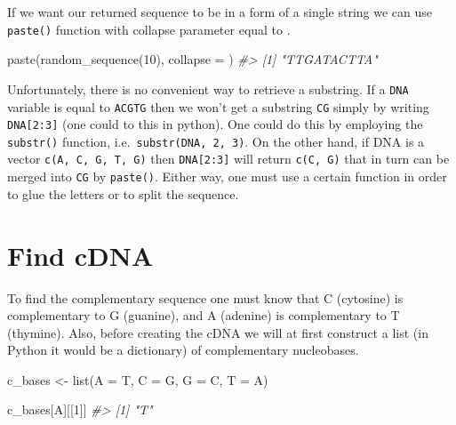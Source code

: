 \documentclass[
]{book}
\newenvironment{Shaded}{\begin{snugshade}}{\end{snugshade}}
\newcommand{\AttributeTok}[1]{\textcolor[rgb]{0.77,0.63,0.00}{#1}}
\newcommand{\CommentTok}[1]{\textcolor[rgb]{0.56,0.35,0.01}{\textit{#1}}}
\newcommand{\DecValTok}[1]{\textcolor[rgb]{0.00,0.00,0.81}{#1}}
\newcommand{\FunctionTok}[1]{\textcolor[rgb]{0.00,0.00,0.00}{#1}}
\newcommand{\NormalTok}[1]{#1}
\newcommand{\OtherTok}[1]{\textcolor[rgb]{0.56,0.35,0.01}{#1}}
\newcommand{\StringTok}[1]{\textcolor[rgb]{0.31,0.60,0.02}{#1}}
\begin{document}
If we want our returned sequence to be in a form of a single string we can use \texttt{paste()} function with collapse parameter equal to \texttt{\textquotesingle{}\textquotesingle{}}.

\begin{Shaded}
\begin{Highlighting}[]
\FunctionTok{paste}\NormalTok{(}\FunctionTok{random\_sequence}\NormalTok{(}\DecValTok{10}\NormalTok{), }\AttributeTok{collapse =} \StringTok{\textquotesingle{}\textquotesingle{}}\NormalTok{)}
\CommentTok{\#\textgreater{} [1] "TTGATACTTA"}
\end{Highlighting}
\end{Shaded}

Unfortunately, there is no convenient way to retrieve a substring. If a \texttt{DNA} variable is equal to \texttt{\textquotesingle{}ACGTG\textquotesingle{}} then we won't get a substring \texttt{\textquotesingle{}CG\textquotesingle{}} simply by writing \texttt{DNA{[}2:3{]}} (one could to this in python). One could do this by employing the \texttt{substr()} function, i.e.~\texttt{substr(DNA,\ 2,\ 3)}. On the other hand, if DNA is a vector \texttt{c(\textquotesingle{}A\textquotesingle{},\ \textquotesingle{}C\textquotesingle{},\ \textquotesingle{}G\textquotesingle{},\ \textquotesingle{}T\textquotesingle{},\ \textquotesingle{}G\textquotesingle{})} then \texttt{DNA{[}2:3{]}} will return \texttt{c(\textquotesingle{}C\textquotesingle{},\ \textquotesingle{}G\textquotesingle{})} that in turn can be merged into \texttt{\textquotesingle{}CG\textquotesingle{}} by \texttt{paste()}. Either way, one must use a certain function in order to glue the letters or to split the sequence.

\hypertarget{find-cdna}{%
\section{Find cDNA}\label{find-cdna}}

To find the complementary sequence one must know that C (cytosine) is complementary to G (guanine), and A (adenine) is complementary to T (thymine). Also, before creating the cDNA we will at first construct a list (in Python it would be a dictionary) of complementary nucleobases.

\begin{Shaded}
\begin{Highlighting}[]
\NormalTok{c\_bases }\OtherTok{\textless{}{-}} \FunctionTok{list}\NormalTok{(}\StringTok{\textquotesingle{}A\textquotesingle{}} \OtherTok{=} \StringTok{\textquotesingle{}T\textquotesingle{}}\NormalTok{, }\StringTok{\textquotesingle{}C\textquotesingle{}} \OtherTok{=} \StringTok{\textquotesingle{}G\textquotesingle{}}\NormalTok{, }\StringTok{\textquotesingle{}G\textquotesingle{}} \OtherTok{=} \StringTok{\textquotesingle{}C\textquotesingle{}}\NormalTok{, }\StringTok{\textquotesingle{}T\textquotesingle{}} \OtherTok{=} \StringTok{\textquotesingle{}A\textquotesingle{}}\NormalTok{)}

\NormalTok{c\_bases[}\StringTok{\textquotesingle{}A\textquotesingle{}}\NormalTok{][[}\DecValTok{1}\NormalTok{]]}
\CommentTok{\#\textgreater{} [1] "T"}
\end{Highlighting}
\end{Shaded}
\end{document}

